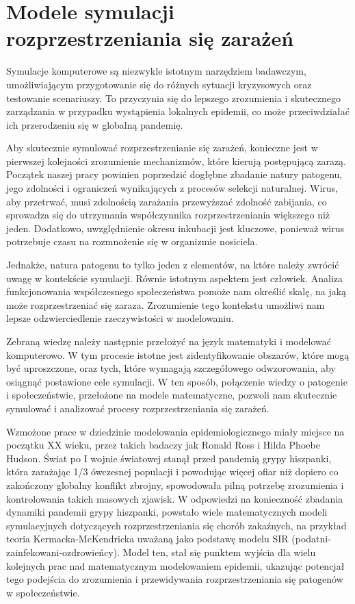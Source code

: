 \chapter{Modele symulacji rozprzestrzeniania się zarażeń}
Symulacje komputerowe są niezwykle istotnym narzędziem badawczym, umożliwiającym przygotowanie się do różnych sytuacji kryzysowych oraz testowanie scenariuszy. To przyczynia się do lepszego zrozumienia i skutecznego zarządzania w przypadku wystąpienia lokalnych epidemii, co może przeciwdziałać ich przerodzeniu się w globalną pandemię.

Aby skutecznie symulować rozprzestrzenianie się zarażeń, konieczne jest w pierwszej kolejności zrozumienie mechanizmów, które kierują postępującą zarazą. Początek naszej pracy powinien poprzedzić dogłębne zbadanie natury patogenu, jego zdolności i ograniczeń wynikających z procesów selekcji naturalnej. Wirus, aby przetrwać, musi zdolnością zarażania przewyższać zdolność zabijania, co sprowadza się do utrzymania współczynnika rozprzestrzeniania większego niż jeden. Dodatkowo, uwzględnienie okresu inkubacji jest kluczowe, ponieważ wirus potrzebuje czasu na rozmnożenie się w organizmie nosiciela.

Jednakże, natura patogenu to tylko jeden z elementów, na które należy zwrócić uwagę w kontekście symulacji. Równie istotnym aspektem jest człowiek. Analiza funkcjonowania współczesnego społeczeństwa pomoże nam określić skalę, na jaką może rozprzestrzeniać się zaraza. Zrozumienie tego kontekstu umożliwi nam lepsze odzwierciedlenie rzeczywistości w modelowaniu.

Zebraną wiedzę należy następnie przełożyć na język matematyki i modelować komputerowo. W tym procesie istotne jest zidentyfikowanie obszarów, które mogą być uproszczone, oraz tych, które wymagają szczegółowego odwzorowania, aby osiągnąć postawione cele symulacji. W ten sposób, połączenie wiedzy o patogenie i społeczeństwie, przełożone na modele matematyczne, pozwoli nam skutecznie symulować i analizować procesy rozprzestrzeniania się zarażeń. 

Wzmożone prace w dziedzinie modelowania epidemiologicznego miały miejsce na początku XX wieku, przez takich badaczy jak Ronald Ross\cite{bib:RossRonald} i Hilda Phoebe Hudson\cite{bib:RossHudson}\cite{bib:RossHudson2}. Świat po I wojnie światowej stanął przed pandemią grypy hiszpanki, która zarażając 1/3 ówczesnej populacji i powodując więcej ofiar niż dopiero co zakończony globalny konflikt zbrojny\cite{bib:cdc1918pandemic}, spowodowała pilną potrzebę zrozumienia i kontrolowania takich masowych zjawisk. W odpowiedzi na konieczność zbadania dynamiki pandemii grypy hiszpanki, powstało wiele matematycznych modeli symulacyjnych dotyczących rozprzestrzeniania się chorób zakaźnych, na przykład teoria Kermacka-McKendricka\cite{bib:Kermack} uważaną jako podstawę modelu SIR (podatni-zainfekowani-ozdrowieńcy). Model ten, stał się punktem wyjścia dla wielu kolejnych prac nad matematycznym modelowaniem epidemii, ukazując potencjał tego podejścia do zrozumienia i przewidywania rozprzestrzeniania się patogenów w społeczeństwie.

